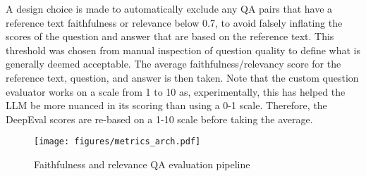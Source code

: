A design choice is made to automatically exclude any QA pairs that have a reference text faithfulness or relevance below 0.7, to avoid falsely inflating the scores of the question and answer that are based on the reference text. This threshold was chosen from manual inspection of question quality to define what is generally deemed acceptable. The average faithfulness/relevancy score for the reference text, question, and answer is then taken. Note that the custom question evaluator works on a scale from 1 to 10 as, experimentally, this has helped the LLM be more nuanced in its scoring than using a 0-1 scale. Therefore, the DeepEval scores are re-based on a 1-10 scale before taking the average. \\


\begin{figure}[H]
    \centering
    \texttt{[image: figures/metrics\_arch.pdf]}
    \caption{Faithfulness and relevance QA evaluation pipeline}
    \label{fig:metrics_arch}
\end{figure}

